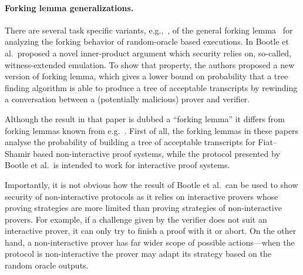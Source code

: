 \documentclass[runningheads,10pt]{llncs}
\begin{document}
\paragraph{Forking lemma generalizations.}
There are several task specific variants, e.g.,~\cite{INDOCRYPT:HerSae03,CCS:BagCheJar08,AC:BelDaiLi19}, of the general forking lemma~\cite{JC:PoiSte00,CCS:BelNev06} for analyzing the forking behavior of random-oracle based executions.
In \cite{EC:BCCGP16} Bootle et al.~proposed a novel inner-product argument which
security relies on, so-called, witness-extended emulation. To show that
property, the authors proposed a new version of forking lemma, which gives a
lower bound on probability that a tree finding algorithm is able to produce a 
tree of acceptable transcripts by rewinding a conversation between a
(potentially malicious) prover and verifier.

Although the result in that paper is dubbed a ``forking lemma'' it
differs from forking lemmas known from e.g.~\cite{JC:PoiSte00,CCS:BelNev06}.
First of all, the forking lemmas in these papers analyse the probability of building
a tree of acceptable transcripts for Fiat--Shamir based non-interactive proof
systems, while the protocol presented by Bootle et al.~is intended to work for
interactive proof systems.

Importantly, it is not obvious how the result of Bootle et al.~can be used to
show security of non-interactive protocols as it relies on interactive provers
whose proving strategies are more limited than proving strategies of
non-interactive provers. For example, if a challenge given by the verifier does not
suit an interactive prover, it can only try to finish a proof with it or
abort. On the other hand, a non-interactive prover has far wider scope of
possible actions---when the protocol is non-interactive the prover may
adapt its strategy based on the random oracle outputs. \iffalse For example,
seeing a response $h$ after sending $k$-th message it may decide to ``go back''
a number of steps, e.g.~prior sending $k'$-th message ($k' \leq k$), provide
different messages hoping for better suited response $h'$ on its $k$-th
message. Furthermore, the adversary may even interrupt the proof and try again
with another instance. All of these actions would make the proof unacceptable
for an interactive verifier, however they may give a perfectly fine proof for a non-interactive one.\fi
\end{document}
